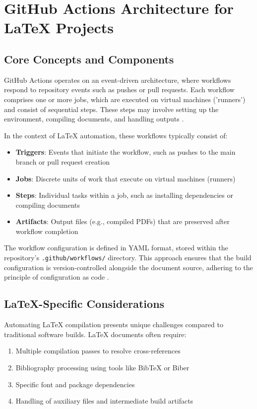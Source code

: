 \section{GitHub Actions Architecture for LaTeX Projects}


\subsection{Core Concepts and Components}

GitHub Actions operates on an event-driven architecture, where workflows respond to repository events such as pushes or pull requests. Each workflow comprises one or more jobs, which are executed on virtual machines ('runners') and consist of sequential steps. These steps may involve setting up the environment, compiling documents, and handling outputs \cite{GitHub:2023}.

In the context of LaTeX automation, these workflows typically consist of:

\begin{itemize}
	\item \textbf{Triggers}: Events that initiate the workflow, such as pushes to the main branch or pull request creation
	\item \textbf{Jobs}: Discrete units of work that execute on virtual machines (runners)
	\item \textbf{Steps}: Individual tasks within a job, such as installing dependencies or compiling documents
	\item \textbf{Artifacts}: Output files (e.g., compiled PDFs) that are preserved after workflow completion
\end{itemize}

The workflow configuration is defined in YAML format, stored within the repository's \texttt{.github/workflows/} directory. This approach ensures that the build configuration is version-controlled alongside the document source, adhering to the principle of configuration as code \cite{Humble:2010}.

\subsection{LaTeX-Specific Considerations}

Automating LaTeX compilation presents unique challenges compared to traditional software builds. LaTeX documents often require:

\begin{enumerate}
	\item Multiple compilation passes to resolve cross-references
	\item Bibliography processing using tools like BibTeX or Biber
	\item Specific font and package dependencies
	\item Handling of auxiliary files and intermediate build artifacts
\end{enumerate}

